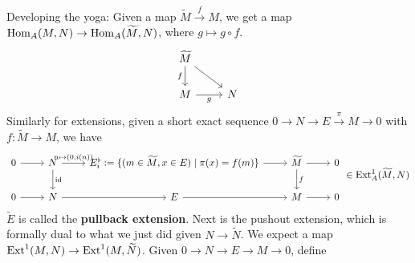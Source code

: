 Developing the yoga: Given a map $\widetilde M \xrightarrow fM$, we get a map $\operatorname{Hom}_A(M,N) \to \operatorname{Hom}_A(\widetilde M ,N)$, where $g \mapsto  g \circ f$. \[
\begin{tikzcd}
    \widetilde M \arrow[d,"f"']\arrow[rd] & \\
    M \arrow[r,"g"'] & N
\end{tikzcd}
\] Similarly for extensions, given a short exact sequence $0 \to  N \to E \xrightarrow{\pi} M \to 0$ with $f \colon \widetilde M \to M$, we have \[
\begin{tikzcd}
0 \arrow[r] & N \arrow[d, "\id"] \arrow[r, "{n\mapsto (0,i(n))}"] & {E_i^{\flat}:=\{(m\in \widetilde M,x \in E) \mid \pi(x)=f(m) \}} \arrow[r] & \widetilde M \arrow[r] \arrow[d,"f"] & 0 \\
0 \arrow[r] & N \arrow[r]                                         & E \arrow[r]                                                                & M \arrow[r]                      & 0
\end{tikzcd} \in \Ext_A^1( \widetilde M,N)
\] $\widetilde E$ is called the \textbf{pullback extension}. Next is the pushout extension, which is formally dual to what we just did given $N \to \widetilde N$. We expect a map $\operatorname{Ext}^1(M,N) \to \operatorname{Ext}^1(M, \widetilde N)$. Given $0 \to N \to E \to M \to 0$, define 
